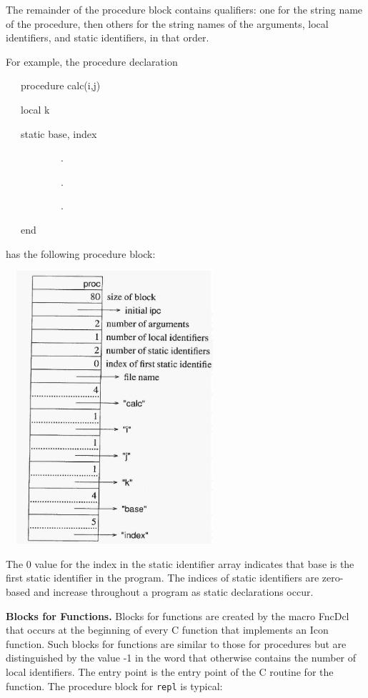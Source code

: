 The remainder of the procedure block contains qualifiers: one for the
string name of the procedure, then others for the string names of the
arguments, local identifiers, and static identifiers, in that order.


For example, the procedure declaration

{\ttfamily\mdseries
\ \ \ procedure calc(i,j)}

{\ttfamily\mdseries
\ \ \ local k}

{\ttfamily\mdseries
\ \ \ static base, index}

{\ttfamily\mdseries
\ \ \ \ \ \ \ \ \ \ \ .}

{\ttfamily\mdseries
\ \ \ \ \ \ \ \ \ \ \ .}

{\ttfamily\mdseries
\ \ \ \ \ \ \ \ \ \ \ .}

{\ttfamily\mdseries
\ \ \ end}


\noindent has the following procedure block:


\ \  \includegraphics[width=2.8846in,height=3.9807in]{ib-img/ib-img077.jpg} 


The 0 value for the index in the static identifier array indicates
that base is the first static identifier in the program. The indices
of static identifiers are zero-based and increase throughout a program
as static declarations occur.


\textbf{Blocks for Functions.} Blocks for functions are created by the
macro FncDcl that occurs at the beginning of every C function that
implements an Icon function. Such blocks for functions are similar to
those for procedures but are distinguished by the value -1 in the word
that otherwise contains the number of local identifiers. The entry
point is the entry point of the C routine for the function. The
procedure block for \texttt{repl} is typical:


